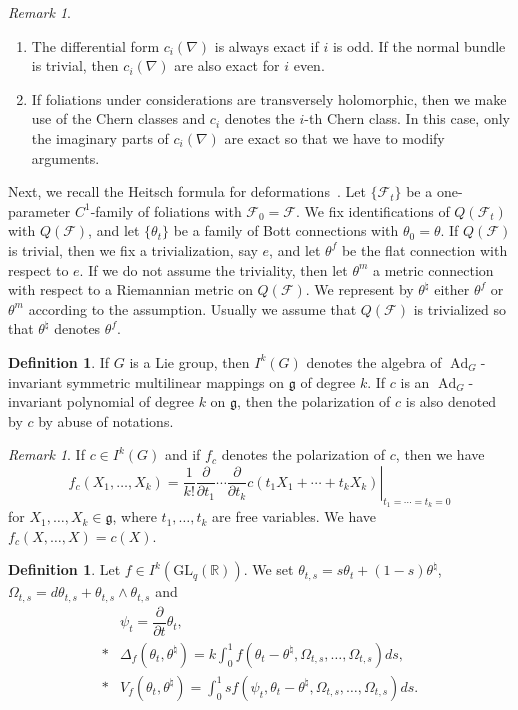 \documentclass[12pt]{amsart}
\newcommand{\CF}{{\mathcal F}}
\newcommand{\R}{{\mathbb R}}
\newcommand{\GL}{\mathrm{GL}}
\DeclareMathOperator{\Ad}{\mathrm{Ad}}
\newcommand{\pdif}[2]{\dfrac{\partial#1}{\partial#2}}
\theoremstyle{definition}
\newtheorem{definition}[theorem]{Definition}
\theoremstyle{remark}
\newtheorem{remark}[theorem]{Remark}
\begin{document}
\begin{remark}
\begin{enumerate}
\item
The differential form $c_i(\nabla)$ is always exact if $i$ is odd.
If the normal bundle is trivial, then $c_i(\nabla)$ are also exact for $i$ even.
\item
If foliations under considerations are transversely holomorphic, then we make use of the Chern classes and $c_i$ denotes the $i$-th Chern class.
In this case, only the imaginary parts of $c_i(\nabla)$ are exact so that we have to modify arguments.
\end{enumerate}
\end{remark}

Next, we recall the Heitsch formula for deformations~\cite{Heitsch:Topology}.
Let $\{\CF_t\}$ be a one-parameter $C^1$-family of foliations with $\CF_0=\CF$.
We fix identifications of $Q(\CF_t)$ with $Q(\CF)$, and let $\{\theta_t\}$ be a family of Bott connections with $\theta_0=\theta$.
If $Q(\CF)$ is trivial, then we fix a trivialization, say $e$, and let $\theta^f$ be the flat connection with respect to $e$.
If we do not assume the triviality, then let $\theta^m$ a metric connection with respect to a Riemannian metric on $Q(\CF)$.
We represent by $\theta^\natural$ either $\theta^f$ or $\theta^m$ according to the assumption.
Usually we assume that $Q(\CF)$ is trivialized so that $\theta^\natural$ denotes $\theta^f$.

\begin{definition}
If $G$ is a Lie group, then $I^k(G)$ denotes the algebra of $\Ad_G$-invariant symmetric multilinear mappings on $\mathfrak{g}$ of degree $k$.
If $c$ is an $\Ad_G$-invariant polynomial of degree $k$ on $\mathfrak{g}$, then the polarization of $c$ is also denoted by $c$ by abuse of notations.
\end{definition}

\begin{remark}
If $c\in I^k(G)$ and if $f_c$ denotes the polarization of $c$, then we have
\[
f_c(X_1,\ldots,X_k)=\left.\frac1{k!}\pdif{}{t_1}\cdots\pdif{}{t_k}c(t_1X_1+\cdots+t_kX_k)\right|_{t_1=\cdots=t_k=0}
\]
for $X_1,\ldots,X_k\in\mathfrak{g}$, where $t_1,\ldots,t_k$ are free variables.
We have $f_c(X,\ldots,X)=c(X)$.
\end{remark}

\begin{definition}
Let $f\in I^k(\GL_q(\R))$.
We set $\theta_{t,s}=s\theta_t+(1-s)\theta^\natural$, $\Omega_{t,s}=d\theta_{t,s}+\theta_{t,s}\wedge\theta_{t,s}$ and
\begin{align*}
&\psi_t=\pdif{}{t}\theta_t,\\*
&\Delta_f(\theta_t,\theta^\natural)=k\int_0^1f(\theta_t-\theta^\natural,\Omega_{t,s},\ldots,\Omega_{t,s})ds,\\*
&V_f(\theta_t,\theta^\natural)=\int_0^1sf(\psi_t,\theta_t-\theta^\natural,\Omega_{t,s},\ldots,\Omega_{t,s})ds.
\end{align*}
\end{definition}
\end{document}
